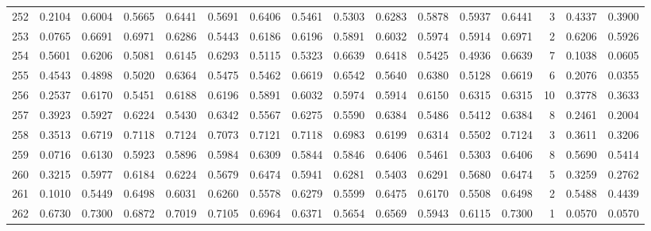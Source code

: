 \begin{tabular}{lrrrrrrrrrrrrrrr}
252 &      0.2104 &  0.6004 &  0.5665 &  0.6441 &  0.5691 &  0.6406 &  0.5461 &  0.5303 &  0.6283 &  0.5878 &   0.5937 &     0.6441 &      3 &                    0.4337 &                     0.3900 \\
253 &      0.0765 &  0.6691 &  0.6971 &  0.6286 &  0.5443 &  0.6186 &  0.6196 &  0.5891 &  0.6032 &  0.5974 &   0.5914 &     0.6971 &      2 &                    0.6206 &                     0.5926 \\
254 &      0.5601 &  0.6206 &  0.5081 &  0.6145 &  0.6293 &  0.5115 &  0.5323 &  0.6639 &  0.6418 &  0.5425 &   0.4936 &     0.6639 &      7 &                    0.1038 &                     0.0605 \\
255 &      0.4543 &  0.4898 &  0.5020 &  0.6364 &  0.5475 &  0.5462 &  0.6619 &  0.6542 &  0.5640 &  0.6380 &   0.5128 &     0.6619 &      6 &                    0.2076 &                     0.0355 \\
256 &      0.2537 &  0.6170 &  0.5451 &  0.6188 &  0.6196 &  0.5891 &  0.6032 &  0.5974 &  0.5914 &  0.6150 &   0.6315 &     0.6315 &     10 &                    0.3778 &                     0.3633 \\
257 &      0.3923 &  0.5927 &  0.6224 &  0.5430 &  0.6342 &  0.5567 &  0.6275 &  0.5590 &  0.6384 &  0.5486 &   0.5412 &     0.6384 &      8 &                    0.2461 &                     0.2004 \\
258 &      0.3513 &  0.6719 &  0.7118 &  0.7124 &  0.7073 &  0.7121 &  0.7118 &  0.6983 &  0.6199 &  0.6314 &   0.5502 &     0.7124 &      3 &                    0.3611 &                     0.3206 \\
259 &      0.0716 &  0.6130 &  0.5923 &  0.5896 &  0.5984 &  0.6309 &  0.5844 &  0.5846 &  0.6406 &  0.5461 &   0.5303 &     0.6406 &      8 &                    0.5690 &                     0.5414 \\
260 &      0.3215 &  0.5977 &  0.6184 &  0.6224 &  0.5679 &  0.6474 &  0.5941 &  0.6281 &  0.5403 &  0.6291 &   0.5680 &     0.6474 &      5 &                    0.3259 &                     0.2762 \\
261 &      0.1010 &  0.5449 &  0.6498 &  0.6031 &  0.6260 &  0.5578 &  0.6279 &  0.5599 &  0.6475 &  0.6170 &   0.5508 &     0.6498 &      2 &                    0.5488 &                     0.4439 \\
262 &      0.6730 &  0.7300 &  0.6872 &  0.7019 &  0.7105 &  0.6964 &  0.6371 &  0.5654 &  0.6569 &  0.5943 &   0.6115 &     0.7300 &      1 &                    0.0570 &                     0.0570 \\

\end{tabular}
